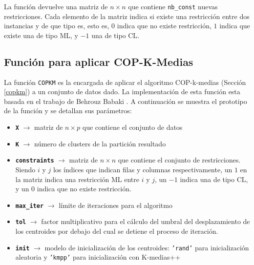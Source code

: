 La función devuelve una matriz de $n \times n$ que contiene \texttt{nb\_const} nuevas restricciones. Cada elemento de la matriz indica si existe una restricción entre dos instancias y de que tipo es, esto es, $0$ indica que no existe restricción, $1$ indica que existe una de tipo \acs{ML}, y $-1$ una de tipo \acs{CL}.

\subsection{Función para aplicar COP-K-Medias}

La función \texttt{COPKM} es la encargada de aplicar el algoritmo COP-k-medias (Sección \ref{copkm}) a un conjunto de datos dado. La implementación de esta función esta basada en el trabajo de Behrouz Babaki \cite{Behrouz:2017}. A continuación se muestra el prototipo de la función y se detallan sus parámetros:


\begin{itemize}
	
	\item \textbf{\texttt{X}} {$\longrightarrow$ matriz de $n \times p$ que contiene el conjunto de datos}
	
	\item \textbf{\texttt{K}} {$\longrightarrow$ número de clusters de la partición resultado}
	
	\item \textbf{\texttt{constraints}} {$\longrightarrow$ matriz de $n \times n$ que contiene el conjunto de restricciones. Siendo $i$ y $j$ los índices que indican filas y columnas respectivamente, un $1$ en la matriz indica una restricción \acs{ML} entre $i$ y $j$, un $-1$ indica una de tipo \acs{CL}, y un $0$ indica que no existe restricción.}
	
	\item \textbf{\texttt{max\_iter}} {$\longrightarrow$ límite de iteraciones para el algoritmo}
	
	\item \textbf{\texttt{tol}} {$\longrightarrow$ factor multiplicativo para el cálculo del umbral del desplazamiento de los centroides por debajo del cual se detiene el proceso de iteración.}
	
	\item \textbf{\texttt{init}} {$\longrightarrow$ modelo de inicialización de los centroides: \texttt{'rand'} para inicialización aleatoria y \texttt{'kmpp'} para inicialización con K-medias++}
	
\end{itemize}


